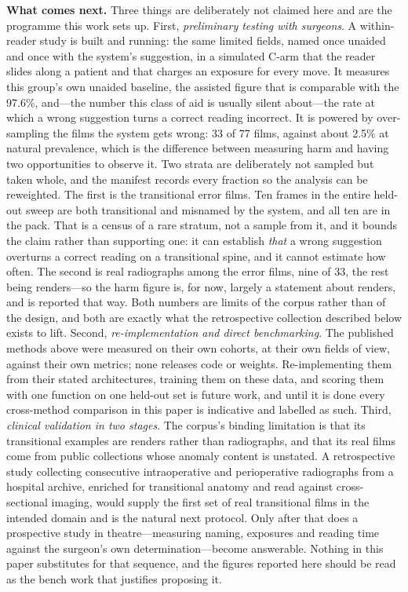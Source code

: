 \documentclass[11pt,letterpaper]{article}
\begin{document}
\textbf{What comes next.} Three things are deliberately not claimed here and are the programme this work sets up. First, \emph{preliminary testing with surgeons}. A within-reader study is built and running: the same limited fields, named once unaided and once with the system's suggestion, in a simulated C-arm that the reader slides along a patient and that charges an exposure for every move. It measures this group's own unaided baseline, the assisted figure that is comparable with the 97.6\%, and---the number this class of aid is usually silent about---the rate at which a wrong suggestion turns a correct reading incorrect. It is powered by over-sampling the films the system gets wrong: 33 of 77 films, against about 2.5\% at natural prevalence, which is the difference between measuring harm and having two opportunities to observe it. Two strata are deliberately not sampled but taken whole, and the manifest records every fraction so the analysis can be reweighted. The first is the transitional error films. Ten frames in the entire held-out sweep are both transitional and misnamed by the system, and all ten are in the pack. That is a census of a rare stratum, not a sample from it, and it bounds the claim rather than supporting one: it can establish \emph{that} a wrong suggestion overturns a correct reading on a transitional spine, and it cannot estimate how often. The second is real radiographs among the error films, nine of 33, the rest being renders---so the harm figure is, for now, largely a statement about renders, and is reported that way. Both numbers are limits of the corpus rather than of the design, and both are exactly what the retrospective collection described below exists to lift. Second, \emph{re-implementation and direct benchmarking}. The published methods above were measured on their own cohorts, at their own fields of view, against their own metrics; none releases code or weights. Re-implementing them from their stated architectures, training them on these data, and scoring them with one function on one held-out set is future work, and until it is done every cross-method comparison in this paper is indicative and labelled as such. Third, \emph{clinical validation in two stages}. The corpus's binding limitation is that its transitional examples are renders rather than radiographs, and that its real films come from public collections whose anomaly content is unstated. A retrospective study collecting consecutive intraoperative and perioperative radiographs from a hospital archive, enriched for transitional anatomy and read against cross-sectional imaging, would supply the first set of real transitional films in the intended domain and is the natural next protocol. Only after that does a prospective study in theatre---measuring naming, exposures and reading time against the surgeon's own determination---become answerable. Nothing in this paper substitutes for that sequence, and the figures reported here should be read as the bench work that justifies proposing it.
\end{document}

